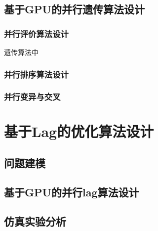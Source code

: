 \subsection{基于GPU的并行遗传算法设计}
\subsubsection{并行评价算法设计}
遗传算法中
\subsubsection{并行排序算法设计}
\subsubsection{并行变异与交叉}

\section{基于Lag的优化算法设计}
\subsection{问题建模}
\subsection{基于GPU的并行lag算法设计}
\subsection{仿真实验分析}
